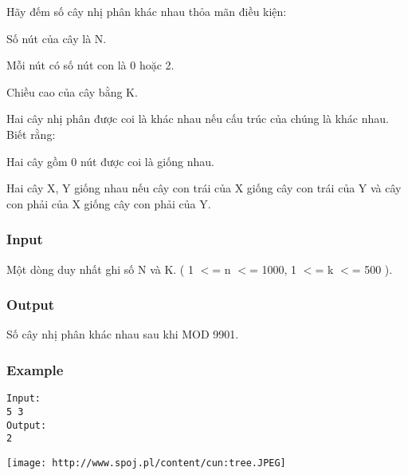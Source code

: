 



   Hãy đếm số cây nhị phân khác nhau thỏa mãn điều kiện:  

   Số nút của cây là N.  

   Mỗi nút có số nút con là 0 hoặc 2.  

   Chiều cao của cây bằng K.  

   Hai cây nhị phân được coi là khác nhau nếu cấu trúc của chúng là khác nhau. Biết rằng:  

   Hai cây gồm 0 nút được coi là giống nhau.  

   Hai cây X, Y giống nhau nếu cây con trái của X giống cây con trái của Y và cây con phải của X giống cây con phải của Y.  

\subsubsection{   Input  }

   Một dòng duy nhất ghi số N và K. ( 1 $<$= n $<$= 1000, 1 $<$= k $<$= 500 ).  

\subsubsection{   Output  }

   Số cây nhị phân khác nhau sau khi MOD 9901.  

\subsubsection{   Example  }
\begin{verbatim}
Input:
5 3
Output:
2
\end{verbatim}
\texttt{[image: http://www.spoj.pl/content/cun:tree.JPEG]}